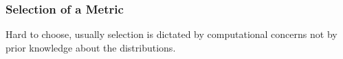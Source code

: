 \begin{multicols}{2}
    \subsubsection{Selection of a Metric}
      Hard to choose, usually selection is dictated by computational concerns not by prior knowledge
      about the distributions.
      
      
  \end{multicols}